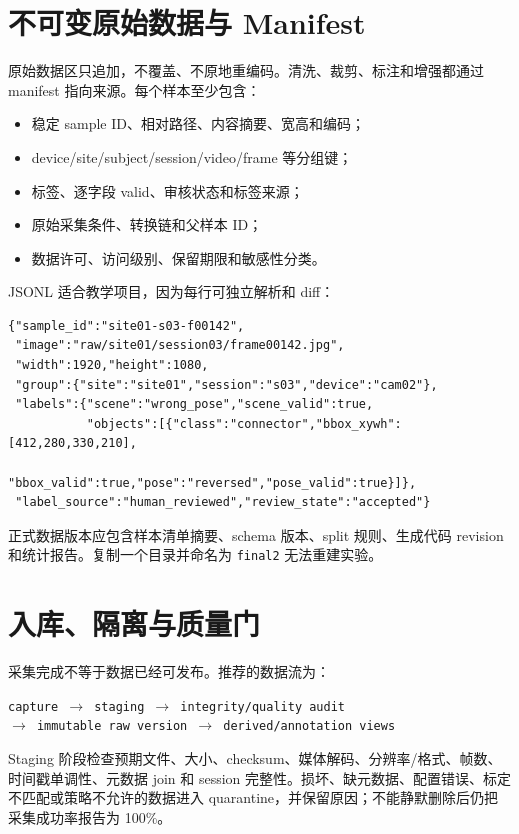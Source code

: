 \section{不可变原始数据与 Manifest}

原始数据区只追加，不覆盖、不原地重编码。清洗、裁剪、标注和增强都通过 manifest 指向来源。每个样本至少包含：

\begin{itemize}
  \item 稳定 sample ID、相对路径、内容摘要、宽高和编码；
  \item device/site/subject/session/video/frame 等分组键；
  \item 标签、逐字段 valid、审核状态和标签来源；
  \item 原始采集条件、转换链和父样本 ID；
  \item 数据许可、访问级别、保留期限和敏感性分类。
\end{itemize}

JSONL 适合教学项目，因为每行可独立解析和 diff：

\begin{lstlisting}[caption={多任务视觉样本的简化 JSONL 结构}]
{"sample_id":"site01-s03-f00142",
 "image":"raw/site01/session03/frame00142.jpg",
 "width":1920,"height":1080,
 "group":{"site":"site01","session":"s03","device":"cam02"},
 "labels":{"scene":"wrong_pose","scene_valid":true,
           "objects":[{"class":"connector","bbox_xywh":[412,280,330,210],
                       "bbox_valid":true,"pose":"reversed","pose_valid":true}]},
 "label_source":"human_reviewed","review_state":"accepted"}
\end{lstlisting}

正式数据版本应包含样本清单摘要、schema 版本、split 规则、生成代码 revision 和统计报告。复制一个目录并命名为 \texttt{final2} 无法重建实验。

\section{入库、隔离与质量门}

采集完成不等于数据已经可发布。推荐的数据流为：

\begin{center}
\texttt{capture $\rightarrow$ staging $\rightarrow$ integrity/quality audit}
\\
\texttt{$\rightarrow$ immutable raw version $\rightarrow$ derived/annotation views}
\end{center}

Staging 阶段检查预期文件、大小、checksum、媒体解码、分辨率/格式、帧数、时间戳单调性、元数据 join 和 session 完整性。损坏、缺元数据、配置错误、标定不匹配或策略不允许的数据进入 quarantine，并保留原因；不能静默删除后仍把采集成功率报告为 100\%。

